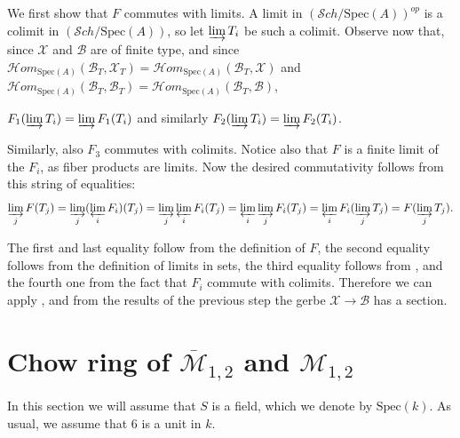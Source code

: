 \documentclass[11pt]{amsart}
\theoremstyle{definition}
\theoremstyle{remark}
\newcounter{step}
\newcommand{\calM}{\mathcal M}
\newcommand{\calH}{\mathcal H}
\newcommand{\calB}{\mathcal B}
\newcommand{\calX}{\mathcal X}
\newcommand{\sS}{\mathscr{S}}
\newcommand{\Spec}{\mathrm{Spec}}
\begin{document}
We first show that $F$ commutes with limits. A limit in $(\sS ch/\Spec(A))^{op}$ is a colimit in $(\sS ch/\Spec(A))$, so let $\varinjlim T_i$ be such a colimit. Observe now that, since $\calX$ and $\calB$ are of finite type, and since $\calH om_{\Spec(A)}(\calB_T, \calX_T) = \calH om_{\Spec(A)}(\calB_T, \calX)$ and $\calH om_{\Spec(A)}(\calB_T, \calB_T) =\calH om_{\Spec(A)}(\calB_T, \calB)$,
\begin{center}$F_1(\varinjlim T_i) = \varinjlim F_1(T_i)$ and similarly $F_2(\varinjlim T_i) = \varinjlim F_2(T_i)$. \end{center}Similarly, also $F_3$ commutes with colimits. Notice also that $F$ is a finite limit of the $F_i$, as fiber products are limits. Now the desired commutativity follows from this string of equalities:
$$\varinjlim_j F(T_j) = \varinjlim_j (\varprojlim_i F_i)(T_j) = \varinjlim_j \varprojlim_i F_i(T_j) =  \varprojlim_i \varinjlim_jF_i(T_j) = \varprojlim_i F_i(\varinjlim_j T_j) = F(\varinjlim_j T_j). $$

The first and last equality follow from the definition of $F$, the second equality follows from the definition of limits in sets, the third equality follows from \cite[\href{https://stacks.math.columbia.edu/tag/04AX}{Section 04AX}]{stacks-project}, and the fourth one from the fact that $F_i$ commute with colimits.
Therefore we can apply \cite[Theorem 3.4]{AHR19}, and from the results of the previous step the gerbe $\calX\to \calB$ has a section.























\section{Chow ring of $\overline{\calM}_{1,2}$ and $\calM_{1,2}$}
In this section we will assume that $S $ is a field, which we denote by $\Spec(k)$. As usual, we assume that $6$ is a unit in $k$.
\end{document}
